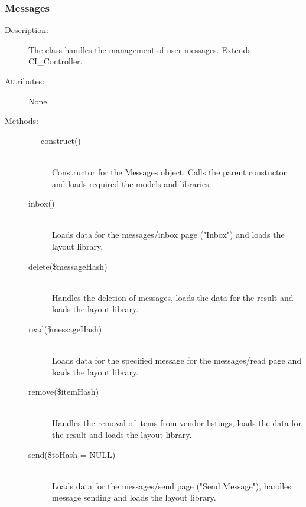 \documentclass[11pt]{article} %
\begin{document}
\subsubsection{Messages}
\begin{description}
\item[Description:] The class handles the management of user messages. Extends CI\_Controller.
\item[Attributes:] None.
\item[Methods:] \textbf{ }
\begin{description}
\item[\_\_construct()]  \textbf{ }\\
Constructor for the Messages object. Calls the parent constuctor and loads required the models and libraries.
\item[inbox()]  \textbf{ }\\
Loads data for the messages/inbox page ("Inbox") and loads the layout library.
\item[delete(\$messageHash)]  \textbf{ }\\
Handles the deletion of messages, loads the data for the result and loads the layout library.
\item[read(\$messageHash)]  \textbf{ }\\
Loads data for the specified message for the messages/read page and loads the layout library.
\item[remove(\$itemHash)]  \textbf{ }\\
Handles the removal of items from vendor listings, loads the data for the result and loads the layout library.
\item[send(\$toHash = NULL)]  \textbf{ }\\
Loads data for the messages/send page ("Send Message"), handles message sending and loads the layout library.
\end{description} 
\end{description} 
\end{document}
